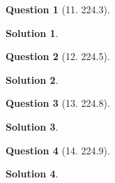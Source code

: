 \documentclass{article} %
\theoremstyle{quest}
\newtheorem*{question}{Question}
\newtheorem*{solution}{Solution}
\begin{document}
\bigskip

\begin{question}[11. 224.3]
\end{question}
\begin{solution}
\end{solution}

\bigskip

\begin{question}[12. 224.5]
\end{question}
\begin{solution}
\end{solution}
\bigskip

\begin{question}[13. 224.8]
\end{question}
\begin{solution}
\end{solution}
\bigskip

\begin{question}[14. 224.9]
\end{question}
\begin{solution}
\end{solution}
\bigskip
\end{document}

